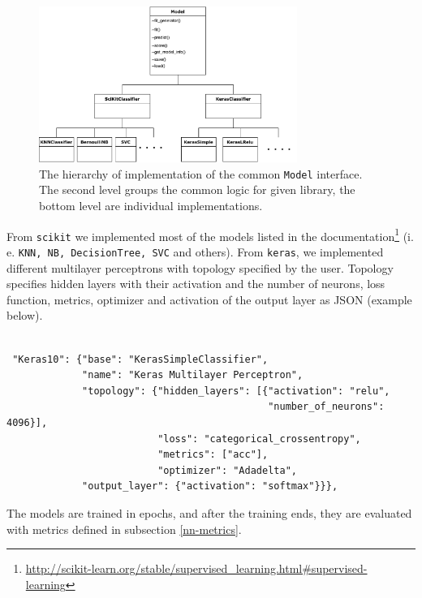 \begin{figure}[H]

\centering
\includegraphics[width=0.75\textwidth]{tex/images/model_inheritance}
\caption{The hierarchy of implementation of the common \texttt{Model} interface. The second level groups the common logic for given library, the bottom level are individual implementations.}
\label{model-inheritance}

\end{figure}

From \texttt{scikit} we implemented most of the models listed in the documentation\footnote{\url{http://scikit-learn.org/stable/supervised\_learning.html\#supervised-learning}} (i. e. \texttt{KNN, NB, DecisionTree, SVC} and others). From \texttt{keras}, we implemented different multilayer perceptrons with topology specified by the user. Topology specifies hidden layers with their activation and the number of neurons, loss function, metrics, optimizer and activation of the output layer as JSON (example below).

\begin{verbatim}

 "Keras10": {"base": "KerasSimpleClassifier",
             "name": "Keras Multilayer Perceptron",
             "topology": {"hidden_layers": [{"activation": "relu",
                                             "number_of_neurons": 4096}],
                          "loss": "categorical_crossentropy",
                          "metrics": ["acc"],
                          "optimizer": "Adadelta",
             "output_layer": {"activation": "softmax"}}},

\end{verbatim}

\noindent
The models are trained in epochs, and after the training ends, they are evaluated with metrics defined in subsection \ref{nn-metrics}.

